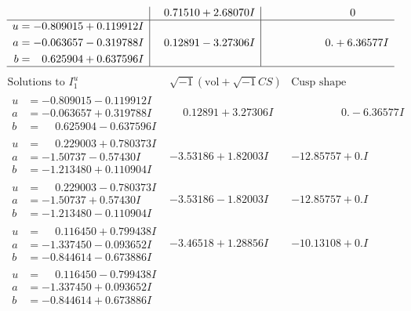 \documentclass[1p]{elsarticle_modified}
\theoremstyle{definition}
\newcommand{\I}{\sqrt{-1}}
\begin{document}
$$\begin{array}{c|c|c}
 & \phantom{-}0.71510 + 2.68070 I & \phantom{-0.000000 } 0 \\ \hline\begin{aligned}
u &= -0.809015 + 0.119912 I \\
a &= -0.063657 - 0.319788 I \\
b &= \phantom{-}0.625904 + 0.637596 I\end{aligned}
 & \phantom{-}0.12891 - 3.27306 I & \phantom{-0.000000 -}0. + 6.36577 I\\
 \hline 
 \end{array}$$\newpage$$\begin{array}{c|c|c}  
\text{Solutions to }I^u_{1}& \I (\text{vol} + \sqrt{-1}CS) & \text{Cusp shape}\\
 \hline 
\begin{aligned}
u &= -0.809015 - 0.119912 I \\
a &= -0.063657 + 0.319788 I \\
b &= \phantom{-}0.625904 - 0.637596 I\end{aligned}
 & \phantom{-}0.12891 + 3.27306 I & \phantom{-0.000000 } 0. - 6.36577 I \\ \hline\begin{aligned}
u &= \phantom{-}0.229003 + 0.780373 I \\
a &= -1.50737 - 0.57430 I \\
b &= -1.213480 + 0.110904 I\end{aligned}
 & -3.53186 + 1.82003 I & -12.85757 + 0. I\phantom{ +0.000000I} \\ \hline\begin{aligned}
u &= \phantom{-}0.229003 - 0.780373 I \\
a &= -1.50737 + 0.57430 I \\
b &= -1.213480 - 0.110904 I\end{aligned}
 & -3.53186 - 1.82003 I & -12.85757 + 0. I\phantom{ +0.000000I} \\ \hline\begin{aligned}
u &= \phantom{-}0.116450 + 0.799438 I \\
a &= -1.337450 - 0.093652 I \\
b &= -0.844614 - 0.673886 I\end{aligned}
 & -3.46518 + 1.28856 I & -10.13108 + 0. I\phantom{ +0.000000I} \\ \hline\begin{aligned}
u &= \phantom{-}0.116450 - 0.799438 I \\
a &= -1.337450 + 0.093652 I \\
b &= -0.844614 + 0.673886 I\end{aligned}

\end{array}$$
\end{document}
